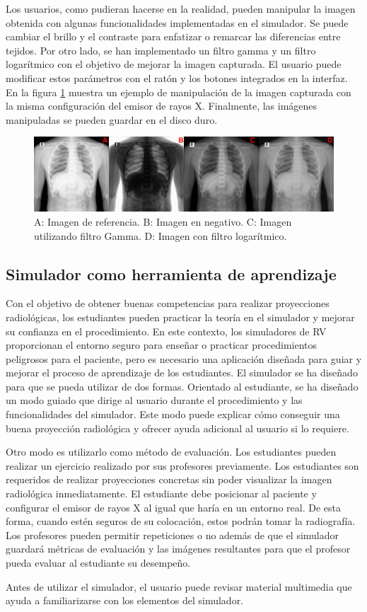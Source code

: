 Los usuarios, como pudieran hacerse en la realidad, pueden manipular la imagen obtenida con algunas funcionalidades implementadas en el simulador. Se puede cambiar el brillo y el contraste para enfatizar o remarcar las diferencias entre tejidos. Por otro lado, se han implementado un filtro gamma y un filtro logarítmico con el objetivo de mejorar la imagen capturada. El usuario puede modificar estos parámetros con el ratón y los botones integrados en la interfaz. En la figura \ref{fig:imgmani} muestra un ejemplo de manipulación de la imagen capturada con la misma configuración del emisor de rayos X.
Finalmente, las imágenes manipuladas se pueden guardar en el disco duro.


\begin{figure}[h]
\centering
\includegraphics[width=0.5\linewidth]{IMG/imgmanipulation.png}
\caption{\label{fig:imgmani} A: Imagen de referencia. B: Imagen en negativo. C: Imagen utilizando filtro Gamma. D: Imagen con filtro logarítmico. }
\end{figure}


\subsection{Simulador como herramienta de aprendizaje}
\label{xray:sim}
Con el objetivo de obtener buenas competencias para realizar proyecciones radiológicas, los estudiantes pueden practicar la teoría en el simulador y mejorar su confianza en el procedimiento. En este contexto, los simuladores de \ac{RV} proporcionan el entorno seguro para enseñar o practicar procedimientos peligrosos para el paciente, pero es necesario una aplicación diseñada para guiar y mejorar el proceso de aprendizaje de los estudiantes. El simulador se ha diseñado para que se pueda utilizar de dos formas. 
Orientado al estudiante, se ha diseñado un modo guiado que dirige al usuario durante el procedimiento y las funcionalidades del simulador. Este modo puede explicar cómo conseguir una buena proyección radiológica y ofrecer ayuda adicional al usuario si lo requiere.

Otro modo es utilizarlo como método de evaluación. Los estudiantes pueden realizar un ejercicio realizado por sus profesores previamente. Los estudiantes son requeridos de realizar proyecciones concretas sin poder visualizar la imagen radiológica inmediatamente. El estudiante debe posicionar al paciente y configurar el emisor de rayos X al igual que haría en un entorno real. De esta forma, cuando estén seguros de su colocación, estos podrán tomar la radiografía. Los profesores pueden permitir repeticiones o no además de que el simulador guardará métricas de evaluación y las imágenes resultantes para que el profesor pueda evaluar al estudiante su desempeño.

Antes de utilizar el simulador, el usuario puede revisar material multimedia que ayuda a familiarizarse con los elementos del simulador.

